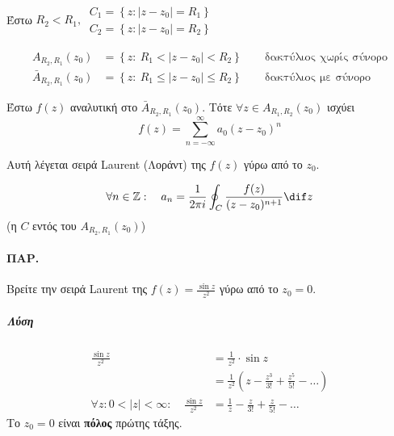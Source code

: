 \documentclass[12pt,a4paper,notitlepage,fleqn]{article}
\begin{document}
  \paragraph{}

  \begin{theorem*}{}
  	Έστω \( R_2 < R_1,\ \begin{array}{l}
  	C_1 = \left\lbrace z:|z-z_0| = R_1 \right\rbrace \\
  	C_2 = \left\lbrace z:|z-z_0| = R_2 \right\rbrace
  	\end{array} \)

  	\begin{align*}
  	A_{R_2,R_1}(z_0) &= \left\lbrace
  	z:\ R_1 < |z-z_0| < R_2
  	 \right\rbrace \qquad \text{δακτύλιος χωρίς σύνορο} \\
  	\bar A_{R_2,R_1}(z_0) &= \left\lbrace
  	z:\ R_1 \leq | z - z_0 | \leq R_2
  	 \right\rbrace \qquad \text{δακτύλιος με σύνορο}
  	\end{align*}


  	Έστω \( f(z) \) αναλυτική στο \( \bar A_{R_2,R_1}(z_0) \). Τότε \( \forall z
  	\in A_{R_1,R_2}(z_0) \) ισχύει \[
  	f(z) = \sum_{n=-\infty}^\infty a_0 (z-z_0)^n
  	\]

  	Αυτή λέγεται σειρά Laurent (Λοράντ) της \( f(z) \) γύρω από το \( z_0 \).

  	\[
  	\forall n \in \mathbb Z: \quad a_n=\frac{1}{2\pi i}\oint_C
  	\frac{f(z)}{(z-z_0)^{n+1}}\dif z
  	\] (η \( C \) εντός του \( A_{R_2,R_1}(z_0) \))
  \end{theorem*}

  \paragraph{ΠΑΡ.}
  Βρείτε την σειρά Laurent της \( f(z) = \frac{\sin z}{z^2} \) γύρω από το
  \( z_0 = 0 \).
  \subparagraph{Λύση}
  \begin{align*}
  \frac{\sin z}{z^2}&=\frac{1}{z^2}\cdot \sin z
  \\ &= \frac{1}{z^2}\left( z-\frac{z^3}{3!}+\frac{z^5}{5!}-\dots \right)
  \\ \forall z: 0<|z|<\infty: \quad \frac{\sin z}{z^2} &= \frac{1}{z}-\frac{z}{3!}
  +\frac{z}{5!}-\dots
  \end{align*}
  Το \( z_0 = 0 \) είναι \textbf{πόλος} πρώτης τάξης.
\end{document}
